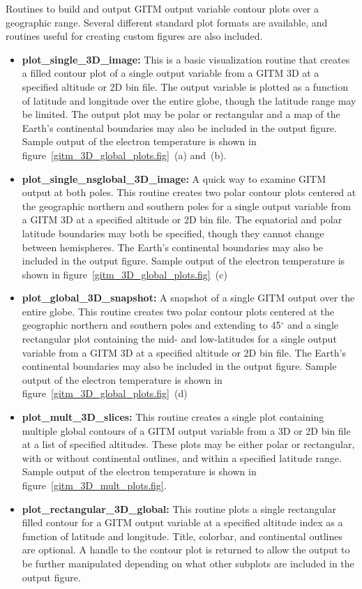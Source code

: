 Routines to build and output GITM output variable contour plots over a geographic range.  Several different standard plot formats are available, and routines useful for creating custom figures are also included.

\begin{itemize}
\item[]{{\bf plot\_single\_3D\_image:}  This is a basic visualization routine that creates a filled contour plot of a single output variable from a GITM 3D at a specified altitude or 2D bin file.  The output variable is plotted as a function of latitude and longitude over the entire globe, though the latitude range may be limited.  The output plot may be polar or rectangular and a map of the Earth's continental boundaries may also be included in the output figure.  Sample output of the electron temperature is shown in figure~\ref{gitm_3D_global_plots.fig}~(a) and~(b).}
\item[]{{\bf plot\_single\_nsglobal\_3D\_image:}  A quick way to examine GITM output at both poles.  This routine creates two polar contour plots centered at the geographic northern and southern poles for a single output variable from a GITM 3D at a specified altitude or 2D bin file.  The equatorial and polar latitude boundaries may both be specified, though they cannot change between hemispheres.  The Earth's continental boundaries may also be included in the output figure.  Sample output of the electron temperature is shown in figure~\ref{gitm_3D_global_plots.fig}~(c)}
\item[]{{\bf plot\_global\_3D\_snapshot:}  A snapshot of a single GITM output over the entire globe.  This routine creates two polar contour plots centered at the geographic northern and southern poles and extending to 45$^\circ$ and a single rectangular plot containing the mid- and low-latitudes for a single output variable from a GITM 3D at a specified altitude or 2D bin file.  The Earth's continental boundaries may also be included in the output figure.  Sample output of the electron temperature is shown in figure~\ref{gitm_3D_global_plots.fig}~(d)}
\item[]{{\bf plot\_mult\_3D\_slices:}  This routine creates a single plot containing multiple global contours of a GITM output variable from a 3D or 2D bin file at a list of specified altitudes.  These plots may be either polar or rectangular, with or without continental outlines, and within a specified latitude range.  Sample output of the electron temperature is shown in figure~\ref{gitm_3D_mult_plots.fig}.}
\item[]{{\bf plot\_rectangular\_3D\_global:} This routine plots a single rectangular filled contour for a GITM output variable at a specified altitude index as a function of latitude and longitude.  Title, colorbar, and continental outlines are optional.  A handle to the contour plot is returned to allow the output to be further manipulated depending on what other subplots are included in the output figure.} 

\end{itemize}

